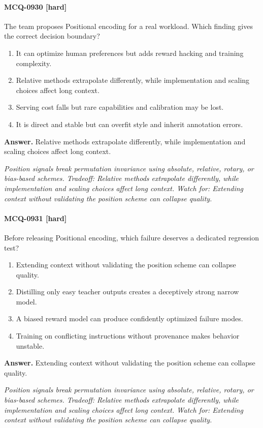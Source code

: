 \paragraph{MCQ-0930 [hard]} The team proposes Positional encoding for a real workload. Which finding gives the correct decision boundary?
\begin{enumerate}[label=\Alph*.]
\item It can optimize human preferences but adds reward hacking and training complexity.
\item Relative methods extrapolate differently, while implementation and scaling choices affect long context.
\item Serving cost falls but rare capabilities and calibration may be lost.
\item It is direct and stable but can overfit style and inherit annotation errors.
\end{enumerate}
\noindent\textbf{Answer.} Relative methods extrapolate differently, while implementation and scaling choices affect long context.
\par\textit{Position signals break permutation invariance using absolute, relative, rotary, or bias-based schemes. Tradeoff: Relative methods extrapolate differently, while implementation and scaling choices affect long context. Watch for: Extending context without validating the position scheme can collapse quality.}
\paragraph{MCQ-0931 [hard]} Before releasing Positional encoding, which failure deserves a dedicated regression test?
\begin{enumerate}[label=\Alph*.]
\item Extending context without validating the position scheme can collapse quality.
\item Distilling only easy teacher outputs creates a deceptively strong narrow model.
\item A biased reward model can produce confidently optimized failure modes.
\item Training on conflicting instructions without provenance makes behavior unstable.
\end{enumerate}
\noindent\textbf{Answer.} Extending context without validating the position scheme can collapse quality.
\par\textit{Position signals break permutation invariance using absolute, relative, rotary, or bias-based schemes. Tradeoff: Relative methods extrapolate differently, while implementation and scaling choices affect long context. Watch for: Extending context without validating the position scheme can collapse quality.}
